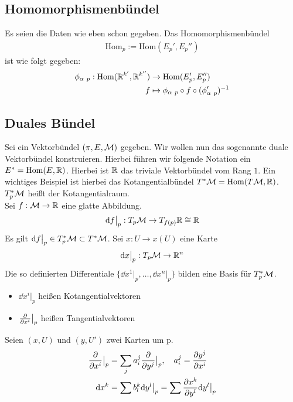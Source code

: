 \subsection{Homomorphismenbündel}
Es seien die Daten wie eben schon gegeben.
Das Homomorphismenbündel
\begin{align}
\mathrm{Hom}_p := \mathrm{Hom}(E_{p}', E_{p}'')
\end{align}
ist wie folgt gegeben:
\begin{align}
\phi_{\alpha \ p} : \mathrm{Hom}(\mathbb{R}^{k'}, \mathbb{R}^{k''}) &\to \mathrm{Hom}(E_{p}', E_{p}'')\\
f &\mapsto \phi_{\alpha \ p} \circ f \circ (\phi_{\alpha \ p}')^{-1}
\end{align}

\subsection{Duales Bündel}
Sei ein Vektorbündel $(\pi, E, \mathcal{M})$ gegeben. 
Wir wollen nun das sogenannte duale Vektorbündel konstruieren.
Hierbei führen wir folgende Notation ein $E^* = \mathrm{Hom}(E, \mathbb{R})$.
Hierbei ist $\mathbb{R}$ das triviale Vektorbündel vom Rang $1$.
Ein wichtiges Beispiel ist hierbei das Kotangentialbündel $T^{*}\mathcal{M} = \mathrm{Hom}(T\mathcal{M} , \mathbb{R})$.
$T^{*}_{p}\mathcal{M}$ heißt der Kotangentialraum.\\
Sei $f: \mathcal{M} \to \mathbb{R}$ eine glatte Abbildung.
\begin{align}
\dd f \big\vert_p : T_p \mathcal{M} \to T_{f(p)}\mathbb{R} \cong \mathbb{R}
\end{align}
Es gilt $\dd f\big\vert_p \in T_p^* \mathcal{M} \subset T^* \mathcal{M}$.
Sei $x: U \to x(U)$ eine Karte 
\begin{align}
\dd x \big\vert_p : T_p \mathcal{M} \to \mathbb{R}^n
\end{align}
Die so definierten Differentiale $\{ \dd x^1 \big\vert_p, \dots , \dd x^n \big\vert_p \}$ bilden eine Basis für $T_p^* \mathcal{M}$.
\begin{itemize}
\item $\dd x^i \big\vert_p$ heißen Kotangentialvektoren
\item $\pdv{x^i} \big\vert_p$ heißen Tangentialvektoren
\end{itemize}
Seien $(x, U)$ und $(y, U')$ zwei Karten um p.
\begin{align}
\pdv{x^i}\big\vert_p &= \sum_j a^j_i \pdv{y^j} \big\vert_p, \quad a^j_i = \pdv{y^j}{x^i} \\
\dd x^k &= \sum b^k_l \dd y^l \big\vert_p = \sum \pdv{x^k}{y^l} \dd y^l \big\vert_p
\end{align}

